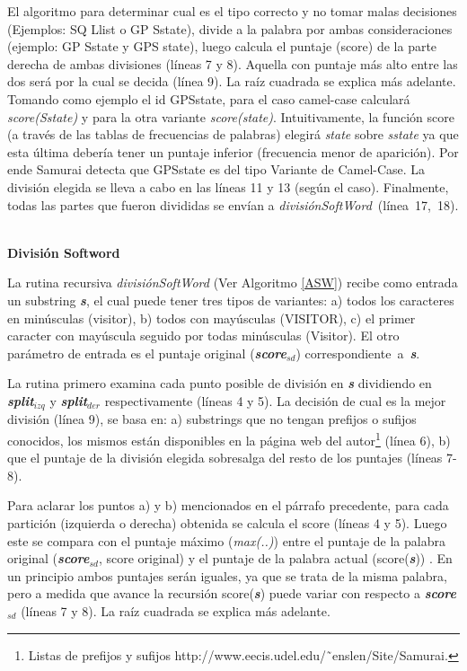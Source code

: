 El algoritmo para determinar cual es el tipo correcto y no tomar malas decisiones (Ejemplos: \textsf{SQ Llist} o \textsf{GP Sstate}), divide a la palabra por ambas consideraciones (ejemplo: \textsf{GP Sstate} y \textsf{GPS state}), luego calcula el puntaje (score) de la parte derecha de ambas divisiones (líneas 7 y 8). Aquella con puntaje más alto entre las dos será por la cual se decida (línea 9). La raíz cuadrada se explica más adelante. Tomando como ejemplo el id \textsf{GPSstate}, para el caso camel-case calculará \mbox{\textit{score(Sstate)}} y para la otra variante \textit{score(state)}. Intuitivamente, la función score (a través de las tablas de frecuencias de palabras) elegirá \textit{state} sobre \textit{sstate} ya que esta última debería tener un puntaje inferior (frecuencia menor de aparición). Por ende Samurai detecta que \textsf{GPSstate} es del tipo Variante de Camel-Case. La división elegida se lleva a cabo en las líneas 11 y 13 (según el caso).
Finalmente, todas las partes que fueron divididas se envían a \mbox{\textit{divisiónSoftWord} (línea 17, 18)}.

\noindent \textbf{\\División Softword\\}

La rutina recursiva \textit{divisiónSoftWord} (Ver Algoritmo \ref{ASW}) recibe como entrada un substring \textbf{\textit{s}}, el cual puede tener tres tipos de variantes: a) todos los caracteres en minúsculas (\textsf{visitor}), b) todos con mayúsculas (\textsf{VISITOR}), c) el primer caracter con mayúscula seguido por todas minúsculas (\textsf{Visitor}). El otro parámetro de entrada es el puntaje original (\textbf{\textit{score$_{sd}$}}) \mbox{correspondiente a \textbf{\textit{s}}}.

La rutina primero examina cada punto posible de división en \textbf{\textit{s}} dividiendo en \textbf{\textit{split$_{izq}$}} y \textbf{\textit{split$_{der}$}} respectivamente (líneas 4 y 5). La decisión de cual es la mejor división (línea 9), se basa en: a) substrings que no tengan prefijos o sufijos conocidos, los mismos están disponibles en la página web del autor\footnote[1]{Listas de prefijos y sufijos  http://www.eecis.udel.edu/˜enslen/Site/Samurai.} (línea 6), b) que el puntaje de la división elegida sobresalga del resto de los puntajes (líneas 7-8).

Para aclarar los puntos a) y b) mencionados en el párrafo precedente, para cada partición (izquierda o derecha) obtenida se calcula el score (líneas 4 y 5). Luego este se compara con el puntaje máximo (\textit{max(..)}) entre el puntaje de la palabra original (\textbf{\textit{score$_{sd}$}}, score original) y el puntaje de la palabra actual (score(\textbf{\textit{s}})) . En un principio ambos puntajes serán iguales, ya que se trata de la misma palabra, pero a medida que avance la recursión score(\textbf{\textit{s}}) puede variar con respecto a \textbf{\textit{score$_{sd}$}} (líneas 7 y 8). La raíz cuadrada se explica más adelante.

